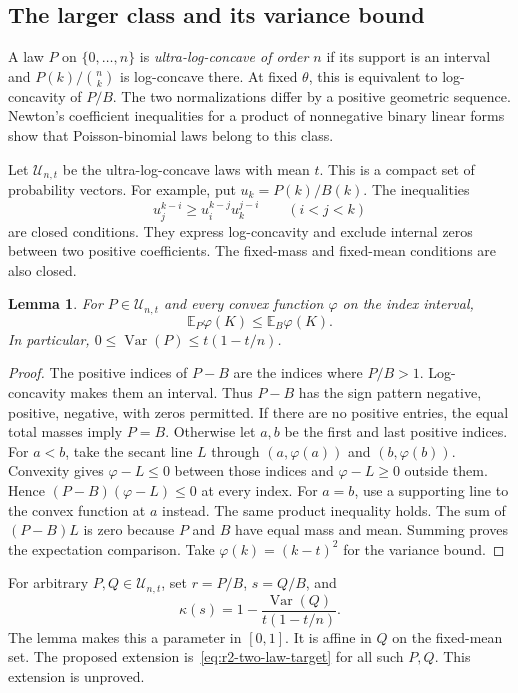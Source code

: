 \documentclass[11pt,a4paper]{article}
\newtheorem{lemma}[theorem]{Lemma}
\theoremstyle{definition}
\theoremstyle{remark}
\begin{document}
\subsection{The larger class and its variance bound}

A law $P$ on $\{0,\ldots,n\}$ is \emph{ultra-log-concave of order $n$} if its support is an interval and $P(k)/\binom nk$ is log-concave there.
At fixed $\theta$, this is equivalent to log-concavity of $P/B$.
The two normalizations differ by a positive geometric sequence.
Newton's coefficient inequalities for a product of nonnegative binary linear forms show that Poisson-binomial laws belong to this class.

Let $\mathcal U_{n,t}$ be the ultra-log-concave laws with mean $t$.
This is a compact set of probability vectors.
For example, put $u_k=P(k)/B(k)$.
The inequalities
\[
 u_j^{k-i}\ge u_i^{k-j}u_k^{j-i}\qquad(i<j<k)
\]
are closed conditions.
They express log-concavity and exclude internal zeros between two positive coefficients.
The fixed-mass and fixed-mean conditions are also closed.

\begin{lemma}\label{lem:r2-ulc-variance}
For $P\in\mathcal U_{n,t}$ and every convex function $\varphi$ on the index interval,
\[
 \mathbb E_P\varphi(K)\le\mathbb E_B\varphi(K).
\]
In particular, $0\le\operatorname{Var}(P)\le t(1-t/n)$.
\end{lemma}

\begin{proof}
The positive indices of $P-B$ are the indices where $P/B>1$.
Log-concavity makes them an interval.
Thus $P-B$ has the sign pattern negative, positive, negative, with zeros permitted.
If there are no positive entries, the equal total masses imply $P=B$.
Otherwise let $a,b$ be the first and last positive indices.
For $a<b$, take the secant line $L$ through $(a,\varphi(a))$ and $(b,\varphi(b))$.
Convexity gives $\varphi-L\le0$ between those indices and $\varphi-L\ge0$ outside them.
Hence $(P-B)(\varphi-L)\le0$ at every index.
For $a=b$, use a supporting line to the convex function at $a$ instead.
The same product inequality holds.
The sum of $(P-B)L$ is zero because $P$ and $B$ have equal mass and mean.
Summing proves the expectation comparison.
Take $\varphi(k)=(k-t)^2$ for the variance bound.
\end{proof}

For arbitrary $P,Q\in\mathcal U_{n,t}$, set $r=P/B$, $s=Q/B$, and
\[
 \kappa(s)=1-\frac{\operatorname{Var}(Q)}{t(1-t/n)}.
\]
The lemma makes this a parameter in $[0,1]$.
It is affine in $Q$ on the fixed-mean set.
The proposed extension is~\eqref{eq:r2-two-law-target} for all such $P,Q$.
This extension is unproved.
\end{document}
